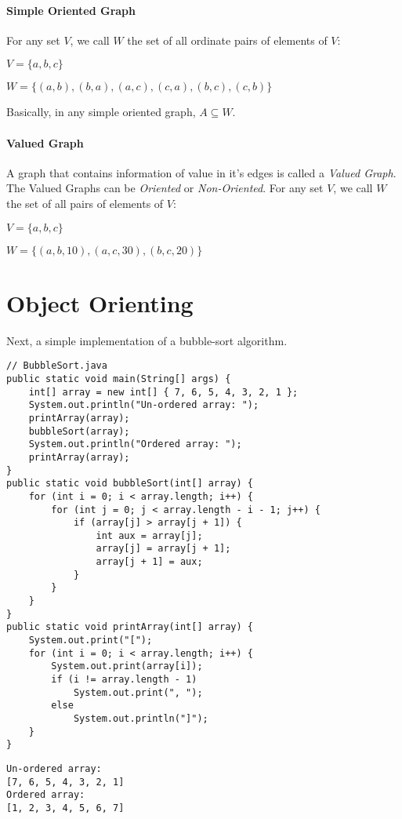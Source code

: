 \documentclass[a4paper,10pt]{article}
\begin{document}
\paragraph*{Simple Oriented Graph}
For any set $V$, we call $W$ the set of all ordinate pairs of elements of $V$:

$V = \{a,b,c\}$

$W = \{(a,b),(b,a),(a,c),(c,a),(b,c),(c,b)\}$

Basically, in any simple oriented graph, $ A \subseteq W $.

\paragraph*{Valued Graph}
A graph that contains information of value in it's edges is called a \emph{Valued Graph}. The Valued Graphs can be \emph{Oriented} or \emph{Non-Oriented}.
For any set $V$, we call $W$ the set of all pairs of elements of $V$:

$V = \{a,b,c\}$

$W = \{(a,b, 10),(a,c, 30),(b,c, 20)\}$

\section{Object Orienting}
Next, a simple implementation of a bubble-sort algorithm. 

\begin{lstlisting}
// BubbleSort.java
public static void main(String[] args) {
    int[] array = new int[] { 7, 6, 5, 4, 3, 2, 1 };
    System.out.println("Un-ordered array: ");
    printArray(array);
    bubbleSort(array);
    System.out.println("Ordered array: ");
    printArray(array);
}
public static void bubbleSort(int[] array) {
    for (int i = 0; i < array.length; i++) {
        for (int j = 0; j < array.length - i - 1; j++) {
            if (array[j] > array[j + 1]) {
                int aux = array[j];
                array[j] = array[j + 1];
                array[j + 1] = aux;
            }
        }
    }
}
public static void printArray(int[] array) {
    System.out.print("[");
    for (int i = 0; i < array.length; i++) {
        System.out.print(array[i]);
        if (i != array.length - 1)
            System.out.print(", ");
        else
            System.out.println("]");
    }
}
\end{lstlisting}
\begin{verbatim}
Un-ordered array: 
[7, 6, 5, 4, 3, 2, 1]
Ordered array: 
[1, 2, 3, 4, 5, 6, 7]
\end{verbatim}
\end{document}
